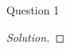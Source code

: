 \begin{solution}{Question 1}
	\begin{question}
	\end{question}
	\tcblower
	\begin{proof}[Solution]
	\end{proof}
\end{solution}
